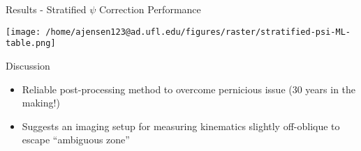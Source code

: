 \documentclass[presentation, aspectratio=1610]{beamer}
\begin{document}
\begin{frame}[label={sec:orgea67ecd}]{Results - Stratified \(\psi\) Correction Performance}
\begin{center}
\texttt{[image: /home/ajensen123@ad.ufl.edu/figures/raster/stratified-psi-ML-table.png]}
\end{center}
\end{frame}
\begin{frame}[label={sec:orgf2c4bd2}]{Discussion}
\begin{itemize}
\item Reliable post-processing method to overcome pernicious issue (30 years in the making!)
\item Suggests an imaging setup for measuring kinematics slightly off-oblique to escape ``ambiguous zone''
\end{itemize}
\end{frame}
\end{document}

